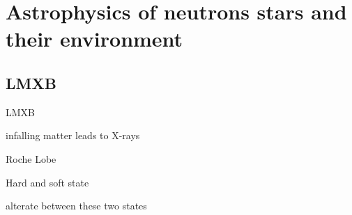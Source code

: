 \chapter{Astrophysics of neutrons stars and their environment}

\section{LMXB}

LMXB \cite{TH06}

infalling matter leads to X-rays \cite{Lewin93}

Roche Lobe \cite{PRP02} \cite{LL15}

Hard and soft state \cite{HvdK89}

alterate between these two states \cite{MDF14} \cite{DGK07}



